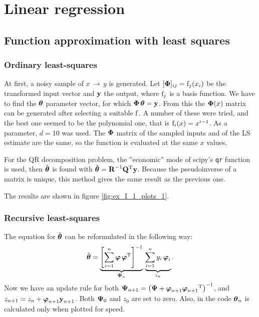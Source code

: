 \section{Linear regression}

\subsection{Function approximation with least squares}


\subsubsection*{Ordinary least-squares}

At first, a noisy sample of $x\,\rightarrow\,y$ is generated.
Let $[\boldsymbol{\mathrm{\Phi}}]_{ij}=\mathrm{f}_j(x_i)$ be the transformed input vector and $\boldsymbol{\mathrm{y}}$ the output,
where $\mathrm{f}_j$ is a basis function. We have to find the $\boldsymbol{\mathrm{\theta}}$ parameter vector,
for which $\boldsymbol{\mathrm{\Phi}}\,\boldsymbol{\mathrm{\theta}}=\boldsymbol{\mathrm{y}}$. From this the $\boldsymbol{\mathrm{\Phi}}(x)$ matrix can be generated
after selecting a suitable $\mathrm{f}$. A number of these were tried, and the best one
seemed to be the polynomial one, that is $\mathrm{f}_{i}(x) = x^{i-1}$.
As a parameter, $d=10$ was used.
The $\boldsymbol{\mathrm{\Phi}}$ matrix of the sampled inputs and of the LS estimate are the same,
so the function is evaluated at the same $x$ values.

For the QR decomposition problem, the ''economic'' mode of scipy's \verb|qr| function
is used, then $\hat{\boldsymbol{\mathrm{\theta}}}$ is found with $\hat{\boldsymbol{\mathrm{\theta}}} = \boldsymbol{\mathrm{R}}^{-1}\boldsymbol{\mathrm{Q}}\textsuperscript{T}\boldsymbol{\mathrm{y}}$.
Because the pseudoinverse of a matrix is unique,
this method gives the same result as the previous one.

The results are shown in figure \ref{fig:ex_I_1_plots_1}.

\subsubsection*{Recursive least-squares}

The equation for $\hat{\boldsymbol{\mathrm{\theta}}}$ can be reformulated in the following way:
\begin{equation}
	\hat{\boldsymbol{\mathrm{\theta}}} = \underbrace{\left[\sum\limits_{i=1}^n{\boldsymbol{\mathrm{\varphi}}\,\boldsymbol{\mathrm{\varphi}}\textsuperscript{T}}\right]^{-1}}_{\boldsymbol{\mathrm{\Psi}}_n}\,
	\underbrace{\sum\limits_{i=1}^n{y_{i}\,\boldsymbol{\mathrm{\varphi}}_{i} }}_{z_n}.
\end{equation}
Now we have an update rule for both $\boldsymbol{\mathrm{\Psi}}_{n+1} = \left(\boldsymbol{\mathrm{\Psi}} + \boldsymbol{\mathrm{\varphi}}_{n+1}\boldsymbol{\mathrm{\varphi}}_{n+1}\textsuperscript{T}\right)^{-1}$, and $z_{n+1} = z_n + \boldsymbol{\mathrm{\varphi}}_{n+1}\boldsymbol{\mathrm{y}}_{n+1}$.
Both $\boldsymbol{\mathrm{\Psi}}_0$ and $z_0$ are set to zero. 
Also, in the code $\boldsymbol{\mathrm{\theta}}_n$ is calculated only when plotted for speed.

